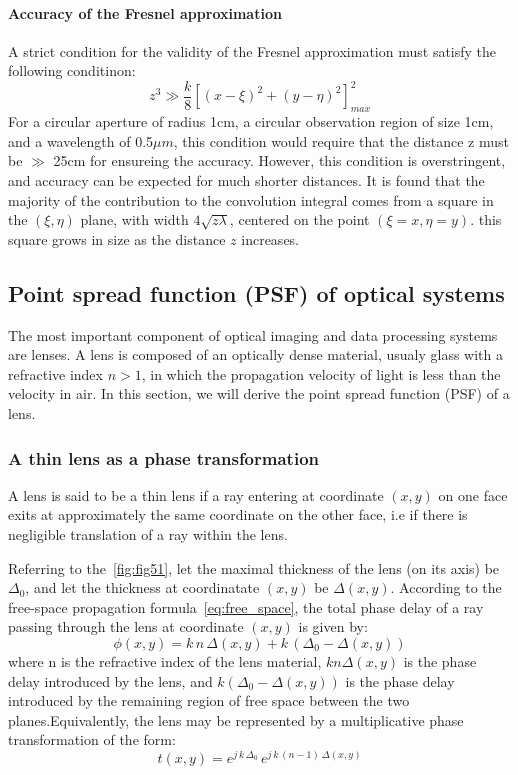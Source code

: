 \documentclass{article}
\begin{document}
\paragraph{Accuracy of the Fresnel approximation} A strict condition for the validity of the Fresnel approximation must satisfy the following conditinon:
\begin{equation}
    z^3 \gg \frac{k}{8} \left[(x-\xi)^2 + (y-\eta)^2\right]_{max}^2
\end{equation}
For a circular aperture of radius 1cm, a circular observation region of size 1cm, and a wavelength of 0.5$\mu m$, this condition would require that the distance z must be  $\gg$ 25cm for ensureing the accuracy. However, this condition is overstringent, and accuracy can be expected for much shorter distances. It is found that the majority of the contribution to the convolution integral comes from a square in the $(\xi,\eta)$ plane, with width $4\sqrt{z \lambda}$, centered on the point $(\xi=x,\eta=y)$. this square grows in size as the distance $z$ increases. 

\subsection{Point spread function (PSF) of optical systems}
The most important component of optical imaging and data processing systems are lenses. A lens is composed of an optically dense material, usualy glass with a refractive index $n > 1$, in which the propagation velocity of light is less than the velocity in air.
 In this section, we will derive the point spread function (PSF) of a lens.
\subsubsection{A thin lens as a phase transformation}
A lens is said to be a thin lens if a ray entering at coordinate $(x,y)$ on one face exits at approximately the same coordinate on the other face, i.e if there is negligible translation of a ray within the lens.


Referring to the~\cref{fig:fig51}, let the maximal thickness of the lens (on its axis) be $
\Delta_0$, and let the thickness at coordinatate $(x,y)$ be $\Delta(x,y)$.
According to the free-space propagation formula~\cref{eq:free_space}, the total phase delay of a ray passing through the lens at coordinate $(x,y)$ is given by: 
\begin{equation}
    \phi(x,y) = k \, n \, \Delta(x,y) + k \, (\Delta_0 - \Delta(x,y))
\end{equation}
where n is the refractive index of the lens material, $kn\Delta(x,y)$ is the phase delay introduced by the lens, and $k(\Delta_0 - \Delta(x,y))$ is the phase delay introduced by the remaining region of free space between the two planes.Equivalently, the lens may be represented by a multiplicative phase transformation of the form:
\begin{equation}\label{eq:phase_delay_lens}
    t(x,y) =  e^{j \, k \, \Delta_0} \,e^{j \, k \, (n-1) \, \Delta(x,y)}
\end{equation}
\end{document}

